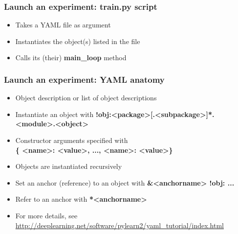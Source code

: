 \documentclass[mathserif, xcolor=dvipsnames]{beamer}
\begin{document}
\begin{frame}
    \frametitle{Launch an experiment: \textbf{train.py} script}
    \Large
    \begin{itemize}\addtolength{\itemsep}{2.0\baselineskip}
        \item{Takes a YAML file as argument}
        \item{Instantiates the object(s) listed in the file}
        \item{Calls its (their) \textbf{main\_loop} method}
    \end{itemize}

\end{frame}

\begin{frame}[fragile]
\frametitle{Launch an experiment: \textbf{YAML} anatomy}

    \begin{itemize}\addtolength{\itemsep}{0.5\baselineskip}
        \item{Object description or list of object descriptions}
        \item{Instantiate an object with
              \textbf{!obj:<package>[.<subpackage>]*.<module>.<object>}}
        \item{Constructor arguments specified with \\
              \textbf{\{ <name>: <value>, ..., <name>: <value>\}}}
        \item{Objects are instantiated recursively}
        \item{Set an anchor (reference) to an object with
              \textbf{\&<anchorname> !obj: ...}}
        \item{Refer to an anchor with \textbf{*<anchorname>}}
        \item{For more details, see \url{http://deeplearning.net/software/pylearn2/yaml_tutorial/index.html}}
    \end{itemize}

\end{frame}
\end{document}
